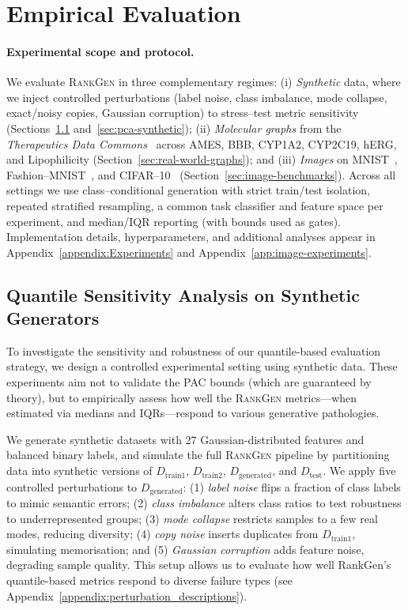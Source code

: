 \section{Empirical Evaluation}
\label{sec:empirical}

\paragraph{Experimental scope and protocol.}
We evaluate \textsc{RankGen} in three complementary regimes:
(i) \emph{Synthetic} data, where we inject controlled perturbations
(label noise, class imbalance, mode collapse, exact/noisy copies, Gaussian corruption)
to stress–test metric sensitivity (Sections~\ref{sec:synthetic-quantile} and~\ref{sec:pca-synthetic});
(ii) \emph{Molecular graphs} from the \textit{Therapeutics Data Commons}~\citep{huang2021tdc}
across AMES, BBB, CYP1A2, CYP2C19, hERG, and Lipophilicity (Section~\ref{sec:real-world-graphs});
and (iii) \emph{Images} on MNIST~\citep{lecun1998gradient}, Fashion--MNIST~\citep{xiao2017fashion},
and CIFAR--10~\citep{krizhevsky2009learning} (Section~\ref{sec:image-benchmarks}).
Across all settings we use class–conditional generation with strict train/test isolation,
repeated stratified resampling, a common task classifier and feature space per experiment,
and median/IQR reporting (with bounds used as gates). Implementation details,
hyperparameters, and additional analyses appear in Appendix~\ref{appendix:Experiments}
and Appendix~\ref{app:image-experiments}.
\subsection{Quantile Sensitivity Analysis on Synthetic Generators}
\label{sec:synthetic-quantile}

To investigate the sensitivity and robustness of our quantile-based evaluation strategy, we design a controlled experimental setting using synthetic data. These experiments aim not to validate the PAC bounds (which are guaranteed by theory), but to empirically assess how well the \textsc{RankGen} metrics---when estimated via medians and IQRs---respond to various generative pathologies.

We generate synthetic datasets with 27 Gaussian-distributed features and balanced binary labels, and simulate the full \textsc{RankGen} pipeline by partitioning data into synthetic versions of \( D_{\text{train1}} \), \( D_{\text{train2}} \), \( D_{\text{generated}} \), and \( D_{\text{test}} \). We apply five controlled perturbations to \( D_{\text{generated}} \): (1) \textit{label noise} flips a fraction of class labels to mimic semantic errors; (2) \textit{class imbalance} alters class ratios to test robustness to underrepresented groups; (3) \textit{mode collapse} restricts samples to a few real modes, reducing diversity; (4) \textit{copy noise} inserts duplicates from \( D_{\text{train1}} \), simulating memorisation; and (5) \textit{Gaussian corruption} adds feature noise, degrading sample quality. This setup allows us to evaluate how well RankGen’s quantile-based metrics respond to diverse failure types (see Appendix~\ref{appendix:perturbation_descriptions}).


